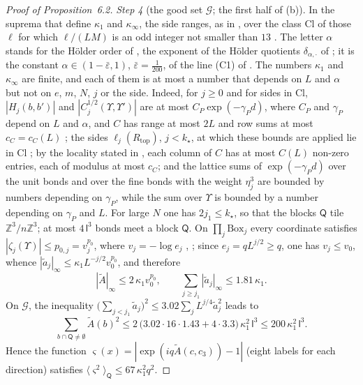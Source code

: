 \documentclass[11pt]{amsart}
\theoremstyle{definition}
\begin{document}
\begin{proof}[Proof of Proposition~6.2]
\emph{Step 4} (the good set $\mathcal G$; the first half of (b)).
In the suprema that define $\kappa_1$ and $\kappa_\infty$, the side ranges, as in \cite[Section~I.1.1]{QEDIII}, over the class $\mathrm{Cl}$ of those $\ell$ for which $\ell/(LM)$ is an odd integer not smaller than $13$ \cite[Section~5.2.3]{QEDI}.
The letter $\alpha$ stands for the H\"older order of \cite[Section~2.7]{QEDI}, the exponent of the H\"older quotients $\delta_{\alpha,\cdot}$ of \cite[(I.1.7)]{QEDIII};
it is the constant $\alpha\in(1-\bar\varepsilon,1)$, $\bar\varepsilon=\frac1{200}$, of the line (C1) of \cite[Section~I.8.2]{QEDIII}.
The numbers $\kappa_1$ and $\kappa_\infty$ are finite, and each of them is at most a number that depends on $L$ and $\alpha$ but not on $e$, $m$, $N$, $j$ or the side.
Indeed, for $j\ge0$ and for sides in $\mathrm{Cl}$, $|H_j(b,b')|$ and $|C_j^{1/2}(\Upsilon,\Upsilon')|$ are at most $C_P\exp(-\gamma_Pd)$, where $C_P$ and $\gamma_P$ depend on $L$ and $\alpha$, and $C$ has range at most $2L$ and row sums at most $c_C=c_C(L)$ \cite[Section~5.4, Propositions~5.32, 5.34, 5.35]{QEDI};
the sides $\ell_j(R_{\mathrm{top}})$, $j<k_\star$, at which these bounds are applied lie in $\mathrm{Cl}$ \cite[Section~G4.0.2, (Sc4)]{QEDIII};
by the locality stated in \cite[Proposition~5.35]{QEDI}, each column of $C$ has at most $C(L)$ non-zero entries, each of modulus at most $c_C$;
and the lattice sums of $\exp(-\gamma_Pd)$ over the unit bonds and over the fine bonds with the weight $\eta_j^3$ are bounded by numbers depending on $\gamma_P$, while the sum over $\Upsilon$ is bounded by a number depending on $\gamma_P$ and $L$.
For large $N$ one has $2j_1\le k_\star$, so that the blocks $\mathsf Q$ tile $\mathbb Z^3/n\mathbb Z^3$;
at most $4\,\mathsf l^3$ bonds meet a block $\mathsf Q$.
On $\prod_j\mathrm{Box}_j$ every coordinate satisfies $|\zeta_j(\Upsilon)|\le p_{0,j}=v_j^{p_0}$, where $v_j=-\log e_j$ \cite[Section~5.2.5]{QEDI}, \cite[Section~I.6.1]{QEDIII};
since $e_j=qL^{j/2}\ge q$, one has $v_j\le v_0$, whence $|\tilde a_j|_\infty\le\kappa_1L^{-j/2}v_0^{p_0}$, and therefore
\begin{equation*}
|\tilde A|_\infty\le2\,\kappa_1v_0^{p_0},\qquad\sum_{j\ge j_1}|\tilde a_j|_\infty\le1.81\,\kappa_1 .
\end{equation*}
On $\mathcal G$, the inequality $\bigl(\sum_{j<j_1}\tilde a_j\bigr)^2\le3.02\sum_jL^{j/4}\tilde a_j^2$ leads to
\begin{equation*}
\sum_{b\cap\mathsf Q\ne\emptyset}\tilde A(b)^2\le2\,\bigl(3.02\cdot16\cdot1.43+4\cdot3.3\bigr)\,\kappa_1^2\,\mathsf l^3\le200\,\kappa_1^2\,\mathsf l^3 .
\end{equation*}
Hence the function $\varsigma(x)=|\exp(iq\tilde A(c,c_3))-1|$ (eight labels for each direction) satisfies $\langle\varsigma^2\rangle_{\mathsf Q}\le67\,\kappa_1^2q^2$.


\end{proof}
\end{document}
